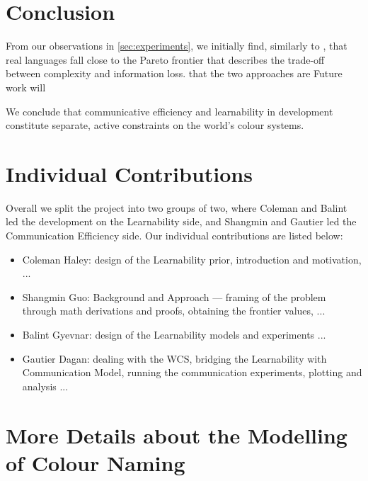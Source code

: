 \documentclass[11pt]{article}
\begin{document}

\section{Conclusion}

From our observations in \ref{sec:experiments}, we initially find, similarly to \cite{zaslavsky2018efficient}, that real languages fall close to the Pareto frontier that describes the trade-off between complexity and information loss.
that the two approaches are
Future work will 

We conclude that communicative efficiency and learnability in development constitute separate, active constraints on the world's colour systems.


\section{Individual Contributions}
Overall we split the project into two groups of two, where Coleman and Balint led the development on the Learnability side, and Shangmin and Gautier led the Communication Efficiency side. 
Our individual contributions are listed below:

\begin{itemize}
    \item Coleman Haley: design of the Learnability prior, introduction and motivation,  ...
    \item Shangmin Guo: Background and Approach --- framing of the problem through math derivations and proofs, obtaining the frontier values,  ...
    \item Balint Gyevnar: design of the Learnability models and experiments ...
    \item Gautier Dagan: dealing with the WCS, bridging the Learnability with Communication Model, running the communication experiments, plotting and analysis ...
\end{itemize}




\newpage
\appendix

\section{More Details about the Modelling of Colour Naming}
\label{appsec:more_details}
\end{document}
